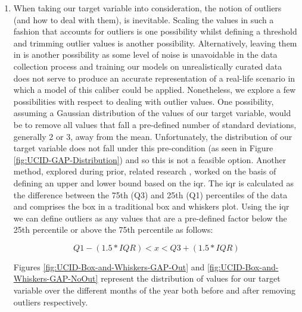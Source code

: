 \begin{adjustwidth}{-1.65cm}{-0.0cm}
\begin{enumerate}[label=Step 3.\arabic*:, leftmargin=*]
    \item When taking our target variable into consideration, the notion of outliers (and how to deal with them), is inevitable. Scaling the values in such a fashion that accounts for outliers is one possibility whilst defining a threshold and trimming outlier values is another possibility. Alternatively, leaving them in is another possibility as some level of noise is unavoidable in the data collection process and training our models on unrealistically curated data does not serve to produce an accurate representation of a real-life scenario in which a model of this caliber could be applied. Nonetheless, we explore a few possibilities with respect to dealing with outlier values. One possibility, assuming a Gaussian distribution of the values of our target variable, would be to remove all values that fall a pre-defined number of standard deviations, generally 2 or 3, away from the mean. Unfortunately, the distribution of our target variable does not fall under this pre-condition (as seen in Figure \ref{fig:UCID-GAP-Distribution}) and so this is not a feasible option. Another method, explored during prior, related research \cite{Kareem}, worked on the basis of defining an upper and lower bound based on the \gls{iqr}. The \gls{iqr} is calculated as the difference between the 75th (Q3) and 25th (Q1) percentiles of the data and comprises the box in a traditional box and whiskers plot. Using the \gls{iqr} we can define outliers as any values that are a pre-defined factor below the 25th percentile or above the 75th percentile as follows:
    
    \begin{equation}
        Q1 - (1.5 * IQR) < x < Q3 + (1.5 * IQR)
    \label{eq:IQR-Outliers}
    \end{equation}
    
    \noindent \newline Figures \ref{fig:UCID-Box-and-Whiskers-GAP-Out} and \ref{fig:UCID-Box-and-Whiskers-GAP-NoOut} represent the distribution of values for our target variable over the different months of the year both before and after removing outliers respectively.


\end{enumerate}
\end{adjustwidth}
